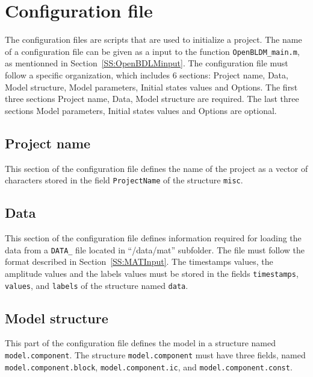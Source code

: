 \section{Configuration file}
\label{S:CFGFile}


The configuration files are \MATLAB{} scripts that are used to initialize a project.
The name of a configuration file can be given as a input to the function   \lstinline[basicstyle = \mlttfamily \small ]!OpenBLDM_main.m!, as mentionned in Section~\ref{SS:OpenBDLMinput}.
The configuration file must follow a specific organization, which includes 6 sections: Project name, Data, Model structure, Model parameters, Initial states values and Options.
The first three sections Project name, Data, Model structure are required.
The last three sections Model parameters, Initial states values and Options are optional.

\subsection{Project name}
This section of the configuration file defines the name of the project as a vector of characters stored in the field \lstinline[basicstyle = \mlttfamily \small ]!ProjectName! of the \MATLAB{} structure \lstinline[basicstyle = \mlttfamily \small ]!misc!.

\subsection{Data}

This section of the configuration file defines information required for loading the data from a \lstinline[basicstyle = \mlttfamily \small ]!DATA_! file located in ``/data/mat'' subfolder.
The file must follow the format described in Section~\ref{SS:MATInput}.
The timestamps values, the amplitude values and the labels values must be stored in the fields \lstinline[basicstyle = \mlttfamily \small]!timestamps!, \lstinline[basicstyle = \mlttfamily \small]!values!, and \lstinline[basicstyle = \mlttfamily \small]!labels! of the \MATLAB{} structure named \lstinline[basicstyle = \mlttfamily \small]!data!.

\subsection{Model structure}
\label{SS:ModelComponents}
This part of the configuration file defines the model in a \MATLAB{} structure named \lstinline[basicstyle = \mlttfamily \small]!model.component!.
The structure \lstinline[basicstyle = \mlttfamily \small]!model.component! must have three fields, named \lstinline[basicstyle = \mlttfamily \small]!model.component.block!, \lstinline[basicstyle = \mlttfamily \small]!model.component.ic!, and \lstinline[basicstyle = \mlttfamily \small]!model.component.const!.

